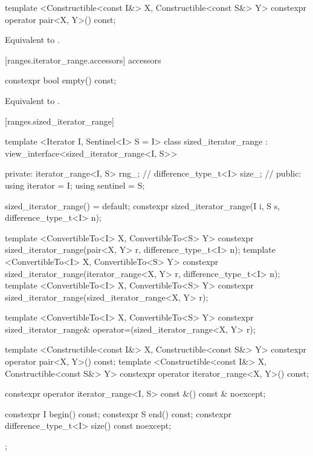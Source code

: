 %
\begin{itemdecl}
template <Constructible<const I&> X, Constructible<const S&> Y>
  constexpr operator pair<X, Y>() const;
\end{itemdecl}

\begin{itemdescr}
\pnum
\returns Equivalent to .
\end{itemdescr}

[ranges.iterator_range.accessors]{ accessors}

%
\begin{itemdecl}
constexpr bool empty() const;
\end{itemdecl}

\begin{itemdescr}
\pnum
\returns Equivalent to .
\end{itemdescr}


[ranges.sized_iterator_range]{}

%
\begin{codeblock}
template <Iterator I, Sentinel<I> S = I>
class sized_iterator_range
  : view_interface<sized_iterator_range<I, S>> {
private:
  iterator_range<I, S> rng_; // \expos
  difference_type_t<I> size_; // \expos
public:
  using iterator = I;
  using sentinel = S;

  sized_iterator_range() = default;
  constexpr sized_iterator_range(I i, S s, difference_type_t<I> n);

  template <ConvertibleTo<I> X, ConvertibleTo<S> Y>
    constexpr sized_iterator_range(pair<X, Y> r, difference_type_t<I> n);
  template <ConvertibleTo<I> X, ConvertibleTo<S> Y>
    constexpr sized_iterator_range(iterator_range<X, Y> r, difference_type_t<I> n);
  template <ConvertibleTo<I> X, ConvertibleTo<S> Y>
    constexpr sized_iterator_range(sized_iterator_range<X, Y> r);

  template <ConvertibleTo<I> X, ConvertibleTo<S> Y>
    constexpr sized_iterator_range& operator=(sized_iterator_range<X, Y> r);

  template <Constructible<const I&> X, Constructible<const S&> Y>
    constexpr operator pair<X, Y>() const;
  template <Constructible<const I&> X, Constructible<const S&> Y>
    constexpr operator iterator_range<X, Y>() const;

  constexpr operator iterator_range<I, S> const &() const & noexcept;

  constexpr I begin() const;
  constexpr S end() const;
  constexpr difference_type_t<I> size() const noexcept;
};
\end{codeblock}

